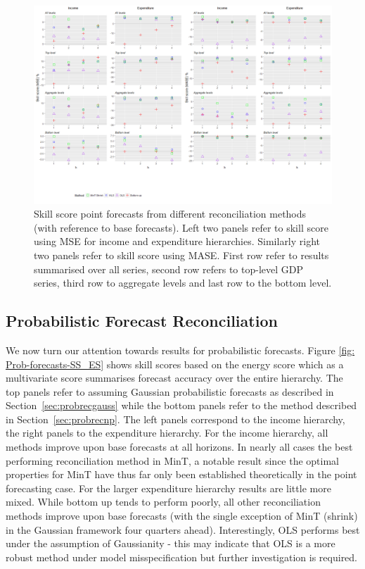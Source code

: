 \documentclass[graybox]{svmult}
\begin{document}
\begin{figure}[H]
	\centering
	\small
	\includegraphics[width=\textwidth]{Figs/Results/PointF.png}
	\caption{Skill score point forecasts from different reconciliation methods (with reference to base forecasts). Left two panels refer to skill score using MSE for income and expenditure hierarchies. Similarly right two panels refer to skill score using MASE. First row refer to results summarised over all series, second row refers to top-level GDP series, third row to aggregate levels and last row to the bottom level.}
	\label{fig: PointF}
\end{figure}





\subsection{Probabilistic Forecast Reconciliation}

We now turn our attention towards results for probabilistic forecasts.  Figure \ref{fig: Prob-forecasts-SS_ES} shows skill scores based on the energy score which as a multivariate score summarises forecast accuracy over the entire hierarchy.  The top panels refer to assuming Gaussian probabilistic forecasts as described in Section~\ref{sec:probrecgauss} while the bottom panels refer to the method described in Section~\ref{sec:probrecnp}.  The left panels correspond to the income hierarchy, the right panels to the expenditure hierarchy.  For the income hierarchy, all methods improve upon base forecasts at all horizons.  In nearly all cases the best performing reconciliation method in MinT, a notable result since the optimal properties for MinT have thus far only been established theoretically in the point forecasting case.  For the larger expenditure hierarchy results are little more mixed.  While bottom up tends to perform poorly, all other reconciliation methods improve upon base forecasts (with the single exception of MinT (shrink) in the Gaussian framework four quarters ahead).  Interestingly, OLS performs best under the assumption of Gaussianity - this may indicate that OLS is a more robust method under model misspecification but further investigation is required.
\end{document}
